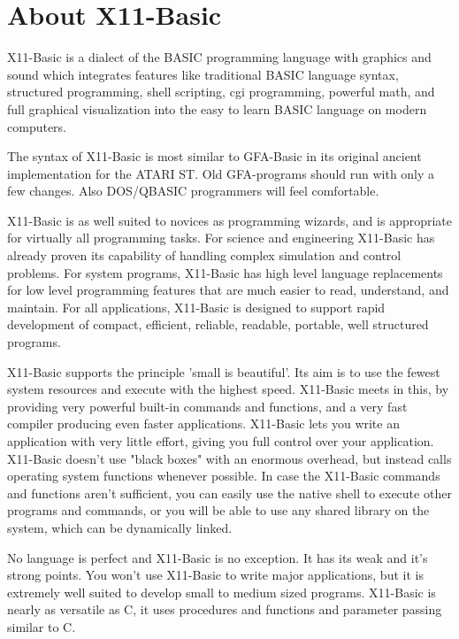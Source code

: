 \chapter{About X11-Basic}

X11-Basic is a dialect of the BASIC programming language with graphics and sound
which integrates features like traditional BASIC language syntax, structured
programming, shell scripting, cgi programming, powerful math, and full graphical
visualization into the easy to learn BASIC language on modern  computers.

The syntax of X11-Basic is most similar to GFA-Basic in its original ancient 
implementation for the ATARI ST. Old GFA-programs should run with only a few 
changes. Also DOS/\-QBASIC programmers will feel comfortable.

X11-Basic is as well suited to novices as programming wizards, and is
appropriate for virtually all programming tasks. For science and engineering
X11-Basic has already proven its capability of handling complex simulation
and control problems. For system programs, X11-Basic has high level language
replacements for low level programming features that are much easier to read,
understand, and maintain. For all applications, X11-Basic is designed to support
rapid development of compact, efficient, reliable, readable, portable, well
structured programs.

X11-Basic supports the principle 'small is beautiful'. Its aim is to use the 
fewest system resources and execute with the highest speed. X11-Basic meets in
this, by providing very powerful built-in commands and functions, and a very fast
compiler producing even faster applications. X11-Basic lets you write an
application with very little effort, giving you full control over your
application. X11-Basic doesn't use "black boxes" with an enormous overhead, but
instead calls operating system functions whenever possible. In case the
X11-Basic commands and functions aren't sufficient, you can easily use the
native shell to execute other programs and commands, or you will be able to use
any shared library on the system, which can be dynamically linked.

No language is perfect and X11-Basic is no exception. It has its weak and
it's strong points. You won't use X11-Basic to write major applications, but
it is extremely well suited to develop small to medium sized programs.
X11-Basic is nearly as versatile as C, it uses procedures and functions and
parameter passing similar to C.

